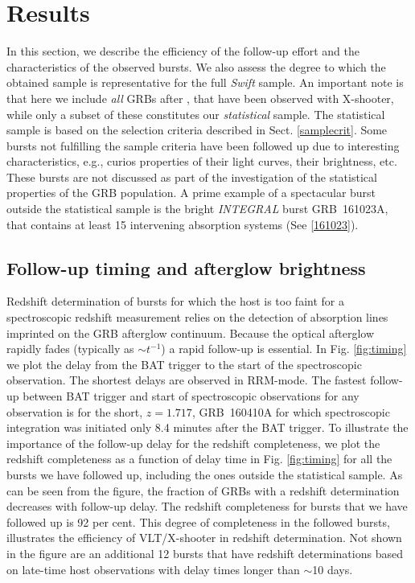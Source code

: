 \documentclass{aa}    %
\begin{document}
\section{Results} \label{results}

In this section, we describe the efficiency of the follow-up effort and the
characteristics of the observed bursts. We also assess the degree to which the
obtained sample is representative for the full \textit{Swift} sample. An
important note is that here we include \textit{all} GRBs after \startdate, that
have been observed with X-shooter, while only a subset of these constitutes our
\textit{statistical} sample. The statistical sample is based on the selection
criteria described in Sect. \ref{samplecrit}. Some bursts not fulfilling the
sample criteria have been followed up due to interesting characteristics, e.g.,
curios properties of their light curves, their brightness, etc. These bursts
are not discussed as part of the investigation of the statistical properties of
the GRB population. A prime example of a spectacular burst outside the
statistical sample is the bright \textit{INTEGRAL} burst GRB~161023A, that
contains at least 15 intervening absorption systems (See \ref{161023}).


\subsection{Follow-up timing and afterglow brightness} \label{timing}

Redshift determination of bursts for which the host is too faint for a
spectroscopic redshift measurement relies on the detection of absorption lines
imprinted on the GRB afterglow continuum. Because the optical afterglow rapidly
fades (typically as $\sim t^{-1}$) a rapid follow-up is essential. In Fig.
\ref{fig:timing} we plot the delay from the BAT trigger to the start of the
spectroscopic observation. The shortest delays are observed in RRM-mode. The
fastest follow-up between BAT trigger and start of spectroscopic observations
for any observation is for the short, $z = 1.717$, GRB~160410A for which
spectroscopic integration was initiated only 8.4 minutes after the BAT trigger.
To illustrate the importance of the follow-up delay for the redshift
completeness, we plot the redshift completeness as a function of delay time in
Fig. \ref{fig:timing} for all the bursts we have followed up, including the ones
outside the statistical sample. As can be seen from the figure, the fraction of
GRBs with a redshift determination decreases with follow-up delay. The redshift
completeness for bursts that we have followed up is 92 per cent. This degree of
completeness in the followed bursts, illustrates the efficiency of VLT/X-shooter
in redshift determination. Not shown in the figure are an additional 12 bursts
that have redshift determinations based on late-time host observations with
delay times longer than $\sim$10 days.
\end{document}
